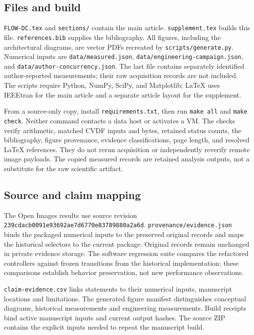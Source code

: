 \documentclass[10pt]{article}
\begin{document}
\subsection{Files and build}
\texttt{FLOW-DC.tex} and \texttt{sections/} contain the main article. \texttt{supplement.tex} builds this file. \texttt{references.bib} supplies the bibliography. All figures, including the architectural diagrams, are vector PDFs recreated by \texttt{scripts/generate.py}. Numerical inputs are \texttt{data/measured.json}, \texttt{data/engineering-campaign.json}, and \texttt{data/author-concurrency.json}. The last file contains separately identified author-reported measurements; their raw acquisition records are not included. The scripts require Python, NumPy, SciPy, and Matplotlib; LaTeX uses IEEEtran for the main article and a separate article layout for the supplement.

From a source-only copy, install \texttt{requirements.txt}, then run \texttt{make all} and \texttt{make check}. Neither command contacts a data host or activates a VM. The checks verify arithmetic, matched CVDF inputs and bytes, retained status counts, the bibliography, figure provenance, evidence classifications, page length, and resolved LaTeX references. They do not rerun acquisition or independently reverify remote image payloads. The copied measured records are retained analysis outputs, not a substitute for the raw scientific artifact.

\subsection{Source and claim mapping}
The Open Images results use source revision \nolinkurl{239cdacb0091e93692ae7d6770e83789880a2a6d}. \nolinkurl{provenance/evidence.json} binds the packaged numerical inputs to the preserved original records and maps the historical selectors to the current package. Original records remain unchanged in private evidence storage. The software regression suite compares the refactored controllers against frozen transitions from the historical implementation; these comparisons establish behavior preservation, not new performance observations.

\nolinkurl{claim-evidence.csv} links statements to their numerical inputs, manuscript locations and limitations. The generated figure manifest distinguishes conceptual diagrams, historical measurements and engineering measurements. Build receipts bind active manuscript inputs and current output hashes. The source ZIP contains the explicit inputs needed to repeat the manuscript build.
\end{document}
